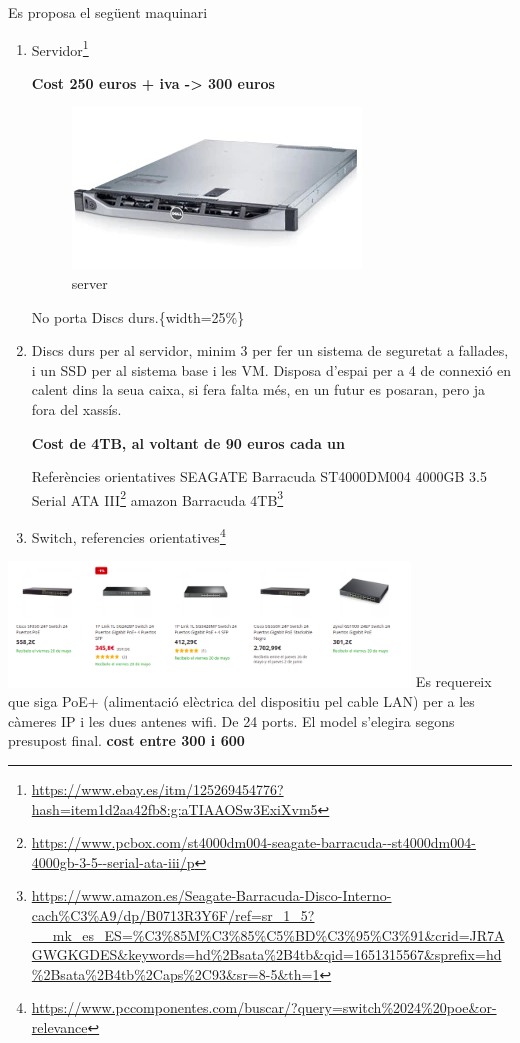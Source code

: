 \documentclass[
  10pt,
]{krantz}
\DeclareRobustCommand{\href}[2]{#2\footnote{\url{#1}}}
\begin{document}
Es proposa el següent maquinari

\begin{enumerate}
\def\labelenumi{\arabic{enumi}.}
\item
  \href{https://www.ebay.es/itm/125269454776?hash=item1d2aa42fb8:g:aTIAAOSw3ExiXvm5}{Servidor}

  \textbf{Cost 250 euros + iva -\textgreater{} 300 euros}

  \begin{figure}
  \centering
  \includegraphics{imatges/serverR320.png}
  \caption{server}
  \end{figure}

  No porta Discs durs.\{width=25\%\}
\item
  Discs durs per al servidor, minim 3 per fer un sistema de seguretat a fallades, i un SSD per al sistema base i les VM. Disposa d'espai per a 4 de connexió en calent dins la seua caixa, si fera falta més, en un futur es posaran, pero ja fora del xassís.

  \textbf{Cost de 4TB, al voltant de 90 euros cada un}

  Referències orientatives \href{https://www.pcbox.com/st4000dm004-seagate-barracuda--st4000dm004-4000gb-3-5--serial-ata-iii/p}{SEAGATE Barracuda ST4000DM004 4000GB 3.5 Serial ATA III} \href{https://www.amazon.es/Seagate-Barracuda-Disco-Interno-cach\%C3\%A9/dp/B0713R3Y6F/ref=sr_1_5?__mk_es_ES=\%C3\%85M\%C3\%85\%C5\%BD\%C3\%95\%C3\%91\&crid=JR7AGWGKGDES\&keywords=hd\%2Bsata\%2B4tb\&qid=1651315567\&sprefix=hd\%2Bsata\%2B4tb\%2Caps\%2C93\&sr=8-5\&th=1}{amazon Barracuda 4TB}
\item
  Switch, \href{https://www.pccomponentes.com/buscar/?query=switch\%2024\%20poe\&or-relevance}{referencies orientatives}
\end{enumerate}

\includegraphics[width=0.8\textwidth,height=\textheight]{imatges/switch.png} Es requereix que siga PoE+ (alimentació elèctrica del dispositiu pel cable LAN) per a les càmeres IP i les dues antenes wifi. De 24 ports. El model s'elegira segons presupost final. \textbf{cost entre 300 i 600}
\end{document}
